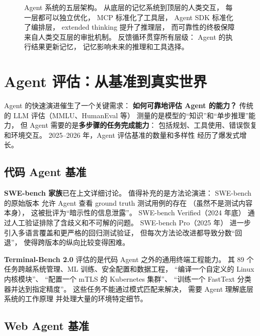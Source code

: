 \begin{figure}[htbp]
\caption{Agent 系统的五层架构。
从底层的记忆系统到顶层的人类交互，
每一层都可以独立优化，
MCP 标准化了工具层，
Agent SDK 标准化了编排层，
extended thinking 提升了推理层，
而可靠性的终极保障来自人类交互层的审批机制。
反馈循环贯穿所有层级：
Agent 的执行结果更新记忆，
记忆影响未来的推理和工具选择。}
\label{fig:agent-architecture-layers}
\end{figure}


\section{Agent 评估：从基准到真实世界}
\label{sec:agent-evaluation}

Agent 的快速演进催生了一个关键需求：
\textbf{如何可靠地评估 Agent 的能力？}
传统的 LLM 评估（MMLU、HumanEval 等）
测量的是模型的“知识”和“单步推理”能力，
但 Agent 需要的是\textbf{多步骤的任务完成能力}：
包括规划、工具使用、错误恢复和环境交互。
2025--2026 年，Agent 评估基准的数量和多样性
经历了爆发式增长。

\subsection{代码 Agent 基准}

\textbf{SWE-bench 家族}已在上文详细讨论。
值得补充的是方法论演进：
SWE-bench 的原始版本
允许 Agent 查看 ground truth 测试用例的存在
（虽然不是测试内容本身），
这被批评为“暗示性的信息泄露”。
SWE-bench Verified（2024 年底）
通过人工验证排除了含歧义和不可解的问题。
SWE-bench Pro（2025 年）
进一步引入多语言覆盖和更严格的回归测试验证，
但每次方法论改进都导致分数“回退”，
使得跨版本的纵向比较变得困难。

\textbf{Terminal-Bench 2.0}
评估的是代码 Agent 之外的通用终端工程能力。
其 89 个任务跨越系统管理、ML 训练、安全配置和数据工程，
“编译一个自定义的 Linux 内核模块”、
“配置一个 mTLS 的 Kubernetes 集群”、
“训练一个 FastText 分类器并达到指定精度”。
这些任务不能通过模式匹配来解决，
需要 Agent 理解底层系统的工作原理
并处理大量的环境特定细节。

\subsection{Web Agent 基准}

